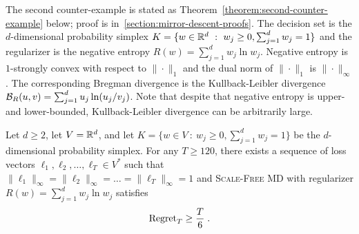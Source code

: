 The second counter-example is stated as
Theorem~\ref{theorem:second-counter-example} below; proof is
in~\ref{section:mirror-descent-proofs}.  The decision set is the
$d$-dimensional probability simplex $K = \{ w \in \mathbb{R}^d ~:~ w_j \ge 0,
\sum_{j=1}^d w_j = 1 \}$ and the regularizer is the negative entropy $R(w) =
\sum_{j=1}^d w_j \ln w_j$.  Negative entropy is $1$-strongly convex with
respect to $\|\cdot\|_1$ and the dual norm of $\|\cdot\|_1$ is
\mbox{$\|\cdot\|_\infty$}.  The corresponding Bregman divergence is the
Kullback-Leibler divergence $\mathcal{B}_R(u,v) = \sum_{j=1}^d u_j \ln(u_j/v_j)$.
Note that despite that negative entropy is upper- and lower-bounded,
Kullback-Leibler divergence can be arbitrarily large.

\begin{theorem}
\label{theorem:second-counter-example}
Let $d \ge 2$, let $V = \mathbb{R}^d$, and let $K = \{ w \in V ~:~ w_j \ge 0,
\sum_{j=1}^d w_j = 1 \}$ be the $d$-dimensional probability simplex.  For any
$T \ge 120$, there exists a sequence of loss vectors $\ell_1, \ell_2, \dots,
\ell_T \in V^*$ such that $\|\ell_1\|_\infty = \|\ell_2\|_\infty = \dots =
\|\ell_T\|_\infty = 1$ and \textsc{Scale-Free MD} with regularizer
$R(w) = \sum_{j=1}^d w_j \ln w_j$ satisfies
$$
\operatorname{Regret}_T \ge \frac{T}{6} \; .
$$
\end{theorem}
